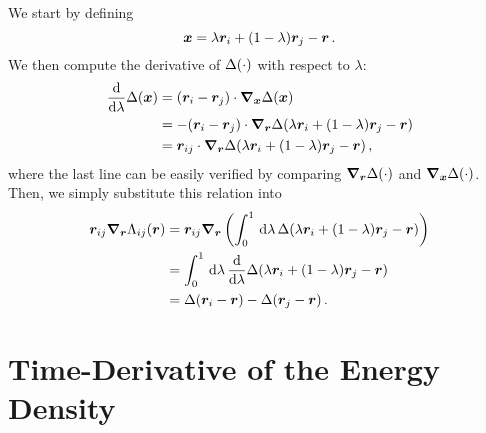 We start by defining
\begin{equation}
	\boldsymbol{x} = \lambda \boldsymbol{r}_i + (1-\lambda) \boldsymbol{r}_j - \boldsymbol{r} \, .
\end{equation}
We then compute the derivative of $\Delta(\cdot)$ with respect to $\lambda$:
\begin{align}
	\frac{\text{d}}{\text{d} \lambda} \Delta(\boldsymbol{x})
	&= (\boldsymbol{r}_i - \boldsymbol{r}_j) \cdot \boldsymbol{\nabla}_{\boldsymbol{x}} \Delta(\boldsymbol{x}) \\
	&= - (\boldsymbol{r}_i - \boldsymbol{r}_j) \cdot \boldsymbol{\nabla}_{\boldsymbol{r}} \Delta(\lambda \boldsymbol{r}_i + (1-\lambda) \boldsymbol{r}_j - \boldsymbol{r}) \\
	&= \boldsymbol{r}_{ij} \cdot \boldsymbol{\nabla}_{\boldsymbol{r}} \Delta(\lambda \boldsymbol{r}_i + (1-\lambda) \boldsymbol{r}_j - \boldsymbol{r}) \, ,
\end{align}
where the last line can be easily verified by comparing $\boldsymbol{\nabla}_{\boldsymbol{r}} \Delta(\cdot)$ and $\boldsymbol{\nabla}_{\boldsymbol{x}} \Delta(\cdot)$. Then, we simply substitute this relation into
\begin{align}
	\boldsymbol{r}_{ij} \boldsymbol{\nabla}_{\boldsymbol{r}} \Lambda_{ij}(\boldsymbol{r}) &=  \boldsymbol{r}_{ij} \boldsymbol{\nabla}_{\boldsymbol{r}} \left( \int_0^1 \, \text{d} \lambda\, \Delta(\lambda \boldsymbol{r}_i + (1-\lambda) \boldsymbol{r}_j - \boldsymbol{r}) \right) \\
	&= \int_0^1 \, \text{d} \lambda \, \frac{\text{d}}{\text{d} \lambda} \Delta(\lambda \boldsymbol{r}_i + (1-\lambda) \boldsymbol{r}_j - \boldsymbol{r}) \\
	&= \Delta(\boldsymbol{r}_i - \boldsymbol{r}) - \Delta(\boldsymbol{r}_j - \boldsymbol{r}) \, .
\end{align}


\section{Time-Derivative of the Energy Density}
\label{sec:si-hf_dt_dense}

